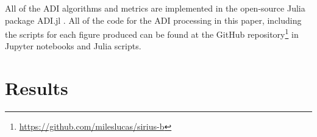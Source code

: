 \documentclass[twocolumn]{aastex631}
\begin{document}
All of the ADI algorithms and metrics are implemented in the open-source Julia package ADI.jl \citep{lucas_adijl_2020}. All of the code for the ADI processing in this paper, including the scripts for each figure produced can be found at the GitHub repository\footnote{\href{https://github.com/mileslucas/sirius-b}{https://github.com/mileslucas/sirius-b}} in Jupyter notebooks and Julia scripts.

\section{Results} \label{sec:results}

\begin{figure*}
    \centering
    \caption{The flat residuals of each epoch after PSF subtraction, derotating, and collapsing. The inner full-width at half-maximum (FWHM) is masked out for each frame.}
    \label{fig:residuals}
\end{figure*}

\begin{figure*}
    \centering
    \caption{The \textit{significance} maps for each epoch accounting for small sample statistics \citep{mawet_fundamental_2014}. Typically a critical value for detection is 5. The inner full-width at half-maximum (FWHM) is masked out for each map.}
    \label{fig:sig}
\end{figure*}

\begin{figure*}
    \centering
    \caption{The STIM maps for each epoch calculated from the residual cube. Note that the STIM probability has a typical cutoff threshold of 0.5 for significant detections. The inner full-width at half-maximum (FWHM) is masked out for each map.}
    \label{fig:stim}
\end{figure*}

\begin{figure*}[t]
    \centering
    \caption{The contrast curves for the best performing algorithm from each epoch. The solid lines are the Gaussian 5$\sigma$ contrast curves and the dashed lines are the Student-t corrected curves. In addition, the expected upper limit for orbital separation of a stable orbit of \qty{1.5}{\au} is plotted as a vertical dashed line. The companion mass values are interpolated from the AMES-Cond grid. The lower mass limit (upper magnitude limit) of these models is plotted in a light-gray horizontal dashed line.}
    \label{fig:contrast}
\end{figure*}
\end{document}
